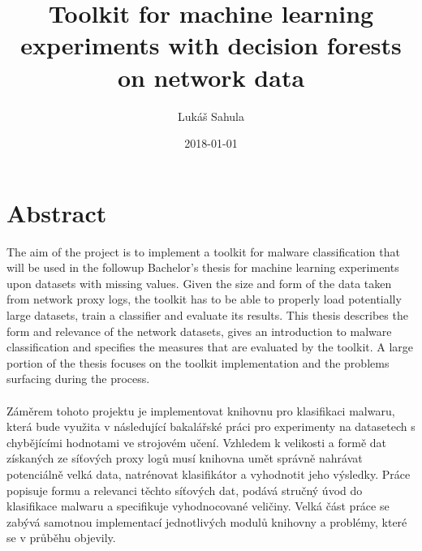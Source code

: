 \documentclass{article}
\title{Toolkit for machine learning experiments with decision forests on network data}
\date{2018-01-01}
\author{Lukáš Sahula}
\begin{document}
  \maketitle
  \newpage
  \section*{Abstract}
    The aim of the project is to implement a toolkit for malware classification that will be used in the followup Bachelor's thesis for machine learning experiments upon datasets with missing values. Given the size and form of the data taken from network proxy logs, the toolkit has to be able to properly load potentially large datasets, train a classifier and evaluate its results. This thesis describes the form and relevance of the network datasets, gives an introduction to malware classification and specifies the measures that are evaluated by the toolkit. A large portion of the thesis focuses on the toolkit implementation and the problems surfacing during the process.
    \\~\\
    Záměrem tohoto projektu je implementovat knihovnu pro klasifikaci malwaru, která bude využita v následující bakalářské práci pro experimenty na datasetech s chybějícími hodnotami ve strojovém učení. Vzhledem k velikosti a formě dat získaných ze síťových proxy logů musí knihovna umět správně nahrávat potenciálně velká data, natrénovat klasifikátor a vyhodnotit jeho výsledky. Práce popisuje formu a relevanci těchto síťových dat, podává stručný úvod do klasifikace malwaru a specifikuje vyhodnocované veličiny. Velká část práce se zabývá samotnou implementací jednotlivých modulů knihovny a problémy, které se v průběhu objevily.
  \newpage
  \tableofcontents
  \newpage
\end{document}
